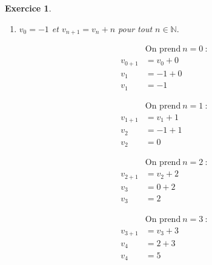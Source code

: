 \documentclass[10pt]{article}
\newtheorem{exo}{Exercice}
\begin{document}
\begin{exo}
\begin{enumerate}
\begin{multicols}{4}
\begin{align*}
&\text{On prend}~n=2~:\\
u_{2+1}&=2u_2-1\\
u_{3}&=2\times 9-1\\
u_3&=17
\end{align*}

\begin{align*}
&\text{On prend}~n=3~:\\
u_{3+1}&=2u_3-1\\
u_{4}&=2\times 17-1\\
u_4&=33
\end{align*}

\end{multicols}

\item $v_0=-1$ et $v_{n+1}=v_n+n$ \qquad pour tout $n\in\mathbb{N}.$

\medskip

\setlength{\columnseprule}{1pt}

\begin{multicols}{4}

\begin{align*}
&\text{On prend}~n=0~:\\
v_{0+1}&=v_0+0\\
v_{1}&=-1+0\\
v_1&=-1
\end{align*}

\begin{align*} 
&\text{On prend}~n=1~:\\
v_{1+1}&=v_1+1\\
v_{2}&=-1+1\\
v_2&=0
\end{align*}

\begin{align*}
&\text{On prend}~n=2~:\\
v_{2+1}&=v_2+2\\
v_{3}&=0+2\\
v_3&=2
\end{align*}

\begin{align*}
&\text{On prend}~n=3~:\\
v_{3+1}&=v_3+3\\
v_{4}&=2+3\\
v_4&=5
\end{align*}

\end{multicols}
\end{enumerate}

\end{exo}
\end{document}
